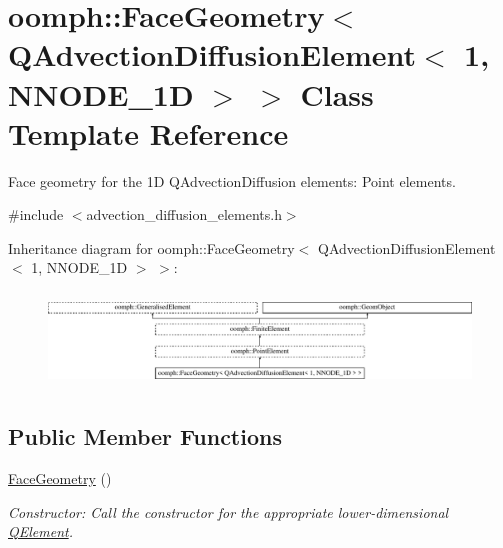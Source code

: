 \hypertarget{classoomph_1_1FaceGeometry_3_01QAdvectionDiffusionElement_3_011_00_01NNODE__1D_01_4_01_4}{}\section{oomph\+:\+:Face\+Geometry$<$ Q\+Advection\+Diffusion\+Element$<$ 1, N\+N\+O\+D\+E\+\_\+1D $>$ $>$ Class Template Reference}
\label{classoomph_1_1FaceGeometry_3_01QAdvectionDiffusionElement_3_011_00_01NNODE__1D_01_4_01_4}


Face geometry for the 1D Q\+Advection\+Diffusion elements\+: Point elements.  




{\ttfamily \#include $<$advection\+\_\+diffusion\+\_\+elements.\+h$>$}

Inheritance diagram for oomph\+:\+:Face\+Geometry$<$ Q\+Advection\+Diffusion\+Element$<$ 1, N\+N\+O\+D\+E\+\_\+1D $>$ $>$\+:\begin{figure}[H]
\begin{center}
\leavevmode
\includegraphics[height=2.551253cm]{classoomph_1_1FaceGeometry_3_01QAdvectionDiffusionElement_3_011_00_01NNODE__1D_01_4_01_4}
\end{center}
\end{figure}
\subsection*{Public Member Functions}
\begin{DoxyCompactItemize}
\item 
\hyperlink{classoomph_1_1FaceGeometry_3_01QAdvectionDiffusionElement_3_011_00_01NNODE__1D_01_4_01_4_afae2c6310d40868a8679d1ec82a869fb}{Face\+Geometry} ()
\begin{DoxyCompactList}\small\item\em Constructor\+: Call the constructor for the appropriate lower-\/dimensional \hyperlink{classoomph_1_1QElement}{Q\+Element}. \end{DoxyCompactList}\end{DoxyCompactItemize}
